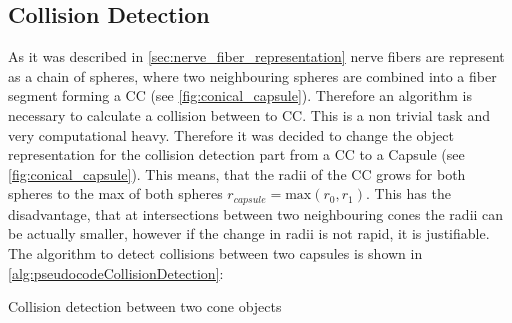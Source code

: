 \subsection{Collision Detection}
% 
As it was described in \cref{sec:nerve_fiber_representation} nerve fibers are represent as a chain of spheres, where two neighbouring spheres are combined into a fiber segment forming a \ac{CC} (see \cref{fig:conical_capsule}).
% 
Therefore an algorithm is necessary to calculate a collision between to \ac{CC}.
This is a non trivial task and very computational heavy.
Therefore it was decided to change the object representation for the collision detection part from a \ac{CC} to a Capsule (see \cref{fig:conical_capsule}).
This means, that the radii of the \ac{CC} grows for both spheres to the max of both spheres $r_{\mathit{capsule}} = \mathrm{max}(r_0, r_1)$.
This has the disadvantage, that at intersections between two neighbouring cones the radii can be actually smaller, however if the change in radii is not rapid, it is justifiable.
\\
The algorithm to detect collisions between two capsules is shown in \cref{alg:pseudocodeCollisionDetection}:
% 
\begin{lstfloat}[!t]
\caption{Collision detection between two cone objects}
\end{lstfloat}
% 
